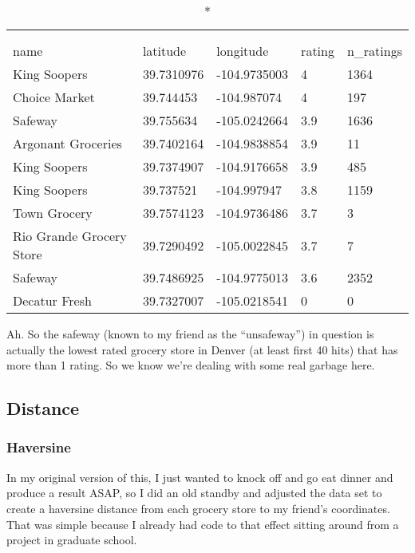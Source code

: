 \documentclass[]{tufte-handout}
\begin{document}
\captionsetup[table]{labelformat=empty,skip=1pt}
\begin{longtable}{lllll}
\caption*{
\large Ten Worst Grocery Stores in Denver\\ 
} \\ 
\toprule
name & latitude & longitude & rating & n\_ratings \\ 
\midrule
King Soopers & 39.7310976 & -104.9735003 & 4 & 1364 \\ 
Choice Market & 39.744453 & -104.987074 & 4 & 197 \\ 
Safeway & 39.755634 & -105.0242664 & 3.9 & 1636 \\ 
Argonant Groceries & 39.7402164 & -104.9838854 & 3.9 & 11 \\ 
King Soopers & 39.7374907 & -104.9176658 & 3.9 & 485 \\ 
King Soopers & 39.737521 & -104.997947 & 3.8 & 1159 \\ 
Town Grocery & 39.7574123 & -104.9736486 & 3.7 & 3 \\ 
Rio Grande Grocery Store & 39.7290492 & -105.0022845 & 3.7 & 7 \\ 
Safeway & 39.7486925 & -104.9775013 & 3.6 & 2352 \\ 
Decatur Fresh & 39.7327007 & -105.0218541 & 0 & 0 \\ 
\bottomrule
\end{longtable}

Ah. So the safeway (known to my friend as the ``unsafeway'') in question
is actually the lowest rated grocery store in Denver (at least first 40
hits) that has more than 1 rating. So we know we're dealing with some
real garbage here.

\hypertarget{distance}{%
\subsection{Distance}\label{distance}}

\hypertarget{haversine}{%
\subsubsection{Haversine}\label{haversine}}

In my original version of this, I just wanted to knock off and go eat
dinner and produce a result ASAP, so I did an old standby and adjusted
the data set to create a haversine distance from each grocery store to
my friend's coordinates. That was simple because I already had code to
that effect sitting around from a project in graduate school.
\end{document}
